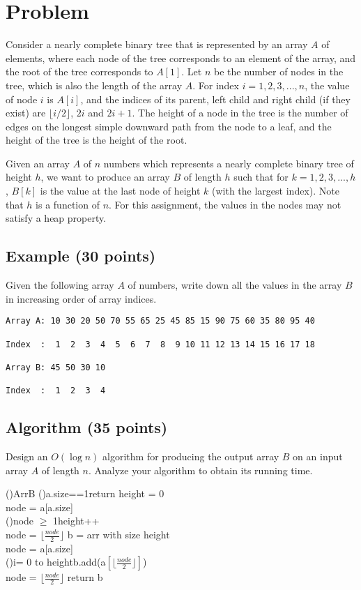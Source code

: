 \documentclass[12pt]{article}
\begin{document}
\section*{Problem}

Consider a nearly complete binary tree that is represented by an array $A$ of elements,
where each node of the tree corresponds to an element of the array,
and the root of the tree corresponds to $A[1]$. Let $n$ be the number of nodes
in the tree, which is also the length of the array $A$.
For index $i = 1, 2, 3, ..., n$, the value of node $i$ is $A[i]$,
and the indices of its parent, left child and right child (if they exist)
are $\lfloor{i/2}\rfloor$, $2i$ and $2i+1$.
The height of a node in the tree is the number of edges on the longest
simple downward path from the node to a leaf, and the height of
the tree is the height of the root.

Given an array $A$ of $n$ numbers which represents a nearly complete binary tree
of height $h$, we want to produce an array $B$ of length $h$ such that
for $k = 1, 2, 3, ..., h$, $B[k]$ is the value at the last node of height $k$
(with the largest index). Note that $h$ is a function of $n$.
For this assignment, the values in the nodes may not satisfy a heap property.

\subsection*{Example (30 points)}

Given the following array $A$ of numbers, write down all the values
in the array $B$ in increasing order of array indices.

\begin{verbatim}
Array A: 10 30 20 50 70 55 65 25 45 85 15 90 75 60 35 80 95 40

Index  :  1  2  3  4  5  6  7  8  9 10 11 12 13 14 15 16 17 18

Array B: 45 50 30 10

Index  :  1  2  3  4
\end{verbatim}
\newpage
\subsection*{Algorithm (35 points)}

Design an $O(\log n)$ algorithm for producing the output array $B$
on an input array $A$ of length $n$. Analyze your algorithm to obtain
its running time.\\
\begin{algorithm}[H]
    \Fn(){ArrB}{
    \SetAlgoLined
    \SetNoFillComment
    \DontPrintSemicolon
    \If(){a.size==1}{return}
    height = 0\\
    node = a[a.size]\\
    \While(){node $\geq$ 1}{height++\\node = $\lfloor \frac{node}{2}\rfloor$  }
    b = arr with size height\\
    node = a[a.size]\\
    \For(){i= 0 to height}{b.add(a$[\lfloor \frac{node}{2}\rfloor]$)\\node = $\lfloor \frac{node}{2}\rfloor$}
    return b
    }
\end{algorithm}
\end{document}
